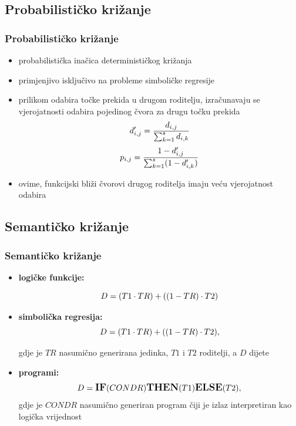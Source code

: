 \documentclass{beamer}
\begin{document}
\subsection{Probabilističko križanje}
\begin{frame}
\frametitle{Probabilističko križanje}
\begin{itemize}
\item{probabilistička inačica determinističkog križanja}
\item{primjenjivo isključivo na probleme simboličke regresije}
\item{prilikom odabira točke prekida u drugom roditelju, izračunavaju se vjerojatnosti odabira pojedinog čvora za drugu točku prekida
\begin{equation} 
 \large{ d '_{i,j} = \frac{d_{i,j}}{\sum_{k=1}^{s} d_{i,k}} }
\end{equation}
\begin{equation} 
\label{prob}
 \large{ p_{i,j} = \frac{1 - d '_{i,j}}{\sum_{k=1}^{s} (1 - d '_{i,k})} }
\end{equation}}
\item{ovime, funkcijski bliži čvorovi drugog roditelja imaju veću vjerojatnost odabira}
\end{itemize}
\end{frame}



\subsection{Semantičko križanje}
\begin{frame}
\frametitle{Semantičko križanje}
\begin{itemize}
\item{\textcolor{colourname}{\textbf{logičke funkcije:}}

 \begin{equation} 
 \large{ D = (T1 \cdot TR) +   ((1-TR) \cdot T2) }
\end{equation}
}
\item{\textcolor{colourname}{\textbf{simbolička regresija:}}
 \begin{equation} 
 \large{ D = (T1 \cdot TR) +   ((1-TR) \cdot T2), }
\end{equation}

 gdje je $TR$ nasumično generirana jedinka, $T1$ i $T2$ roditelji, a $D$ dijete
}
\item{\textcolor{colourname}{\textbf{programi:}}
 \begin{equation} 
 \large{ D = \textbf{IF}(CONDR) \textbf{THEN} (T1) \textbf{ELSE} (T2),}
\end{equation}
gdje je $CONDR$ nasumično generiran program čiji je izlaz interpretiran kao logička vrijednost
}
\end{itemize}

\end{frame}
\end{document}
